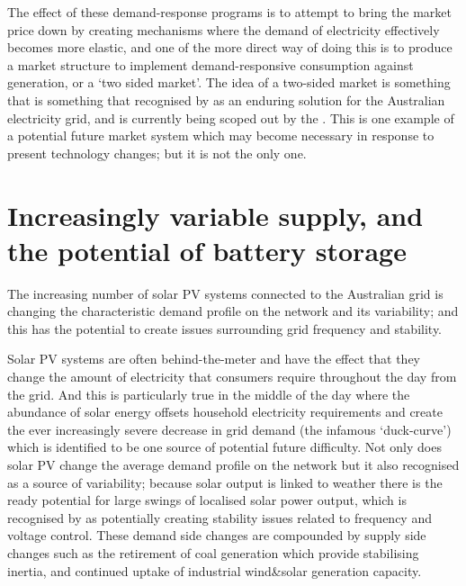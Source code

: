 The effect of these demand-response programs is to attempt to bring the market price down by creating mechanisms where the demand of electricity effectively becomes more elastic, and one of the more direct way of doing this is to produce a market structure to implement demand-responsive consumption against generation, or a `two sided market'.
The idea of a two-sided market is something that is something that recognised by \cite{australianenergymarketcommission2020} as an enduring solution for the Australian electricity grid, and is currently being scoped out by the \cite{energysecurityboard2020}.
This is one example of a potential future market system which may become necessary in response to present technology changes; but it is not the only one.

\section{Increasingly variable supply, and the potential of battery storage}

The increasing number of solar PV systems connected to the Australian grid is changing the characteristic demand profile on the network and its variability; and this has the potential to create issues surrounding grid frequency and stability.

Solar PV systems are often behind-the-meter and have the effect that they change the amount of electricity that consumers require throughout the day from the grid.
And this is particularly true in the middle of the day where the abundance of solar energy offsets household electricity requirements and create the ever increasingly severe decrease in grid demand (the infamous `duck-curve') which is identified to be one source of potential future difficulty.
Not only does solar PV change the average demand profile on the network but it also recognised as a source of variability; because solar output is linked to weather there is the ready potential for large swings of localised solar power output, which is recognised by \cite{australianenergymarketoperatorlimited2018} as potentially creating stability issues related to frequency and voltage control.
These demand side changes are compounded by supply side changes such as the retirement of coal generation which provide stabilising inertia, and continued uptake of industrial wind\&solar generation capacity.

